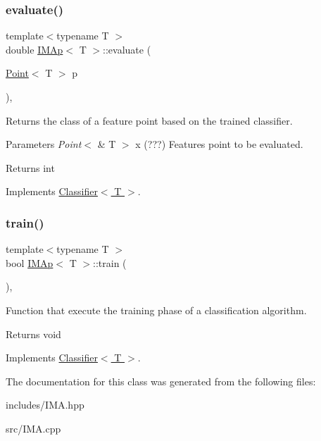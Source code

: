 \subsubsection{\texorpdfstring{evaluate()}{evaluate()}}
{\footnotesize\ttfamily template$<$typename T $>$ \\
double \hyperlink{class_i_m_ap}{I\+M\+Ap}$<$ T $>$\+::evaluate (\begin{DoxyParamCaption}\item[{\hyperlink{class_point}{Point}$<$ T $>$}]{p }\end{DoxyParamCaption})\hspace{0.3cm}{\ttfamily [override]}, {\ttfamily [virtual]}}



Returns the class of a feature point based on the trained classifier. 


\begin{DoxyParams}{Parameters}
{\em Point$<$} & T $>$ x (???) Features point to be evaluated. \\
\hline
\end{DoxyParams}
\begin{DoxyReturn}{Returns}
int 
\end{DoxyReturn}


Implements \hyperlink{class_classifier_ab3b9544a8d9c3cbde8d5865c7e9be0fb}{Classifier$<$ T $>$}.

\mbox{\label{class_i_m_ap_aa8bf6b0d21a76d388fe81ee516b627e4}} 
\subsubsection{\texorpdfstring{train()}{train()}}
{\footnotesize\ttfamily template$<$typename T $>$ \\
bool \hyperlink{class_i_m_ap}{I\+M\+Ap}$<$ T $>$\+::train (\begin{DoxyParamCaption}{ }\end{DoxyParamCaption})\hspace{0.3cm}{\ttfamily [override]}, {\ttfamily [virtual]}}



Function that execute the training phase of a classification algorithm. 

\begin{DoxyReturn}{Returns}
void 
\end{DoxyReturn}


Implements \hyperlink{class_classifier_a120849bfdfa3ba7a0388b32b2d76bf4f}{Classifier$<$ T $>$}.



The documentation for this class was generated from the following files\+:\begin{DoxyCompactItemize}
\item 
includes/I\+M\+A.\+hpp\item 
src/I\+M\+A.\+cpp\end{DoxyCompactItemize}
